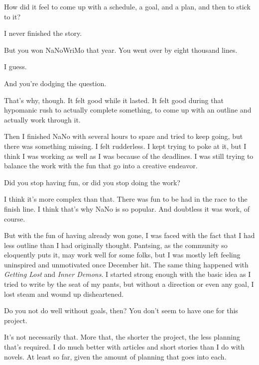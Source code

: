 \begin{leftcolumn}
\begin{ally}
How did it feel to come up with a schedule, a goal, and a plan, and then to stick to it?
\end{ally}
I never finished the story.

\begin{ally}
But you won NaNoWriMo that year. You went over by eight thousand lines.
\end{ally}
I guess.

\begin{ally}
And you're dodging the question.
\end{ally}
That's why, though. It felt good while it lasted. It felt good during that hypomanic rush to actually complete something, to come up with an outline and actually work through it.

Then I finished NaNo with several hours to spare and tried to keep going, but there was something missing. I felt rudderless. I kept trying to poke at it, but I think I was working as well as I was because of the deadlines. I was still trying to balance the work with the fun that go into a creative endeavor.

\begin{ally}
Did you stop having fun, or did you stop doing the work?
\end{ally}
I think it's more complex than that. There was fun to be had in the race to the finish line. I think that's why NaNo is so popular. And doubtless it was work, of course.

But with the fun of having already won gone, I was faced with the fact that I had less outline than I had originally thought. Pantsing, as the community so eloquently puts it, may work well for some folks, but I was mostly left feeling uninspired and unmotivated once December hit. The same thing happened with \emph{Getting Lost} and \emph{Inner Demons}. I started strong enough with the basic idea as I tried to write by the seat of my pants, but without a direction or even any goal, I lost steam and wound up disheartened.

\begin{ally}
Do you not do well without goals, then? You don't seem to have one for this project.
\end{ally}
It's not necessarily that. More that, the shorter the project, the less planning that's required. I do much better with articles and short stories than I do with novels. At least so far, given the amount of planning that goes into each.


\end{leftcolumn}
